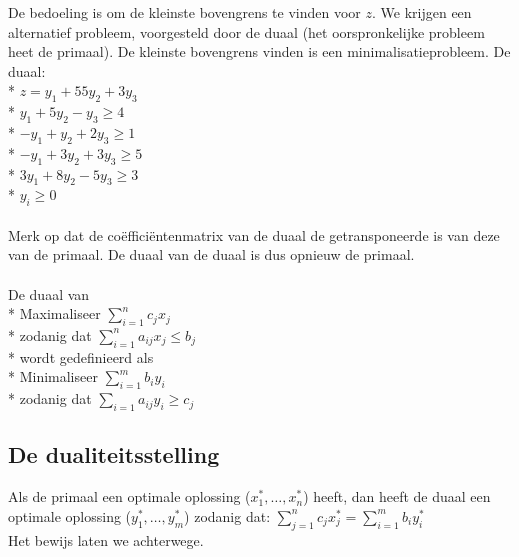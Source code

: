 \documentclass[10pt]{article}
\begin{document}
De bedoeling is om de kleinste bovengrens te vinden voor $z$. We krijgen een alternatief probleem, voorgesteld door de duaal (het oorspronkelijke probleem heet de primaal). De kleinste bovengrens vinden is een minimalisatieprobleem. De duaal:\\*
$z = y_1 + 55y_2 + 3y_3$\\*
$y_1 + 5y_2 - y_3 \ge 4$\\*
$-y_1 + y_2 + 2y_3 \ge 1$\\*
$-y_1 + 3y_2 + 3y_3 \ge 5$\\*
$3y_1 + 8y_2 - 5y_3 \ge 3$\\*
$y_i \ge 0$\\\\
Merk op dat de co\"effici\"entenmatrix van de duaal de getransponeerde is van deze van de primaal. De duaal van de duaal is dus opnieuw de primaal.\\\\
De duaal van\\*
Maximaliseer $\sum_{i = 1}^nc_jx_j$\\*
zodanig dat $\sum_{i = 1}^na_{ij}x_j \le b_j$\\*
wordt gedefinieerd als\\*
Minimaliseer $\sum_{i = 1}^m b_iy_i$\\*
zodanig dat $\sum_{i = 1}a_{ij}y_i \ge c_j$
\subsection{De dualiteitsstelling}
Als de primaal een optimale oplossing ($x_1^*, \dots, x_n^*$) heeft, dan heeft de duaal een optimale oplossing ($y_1^*, \dots, y_m^*$) zodanig dat: $\sum_{j=1}^nc_jx_j^* = \sum_{i=1}^m b_iy_i^*$\\
Het bewijs laten we achterwege.
\end{document}
